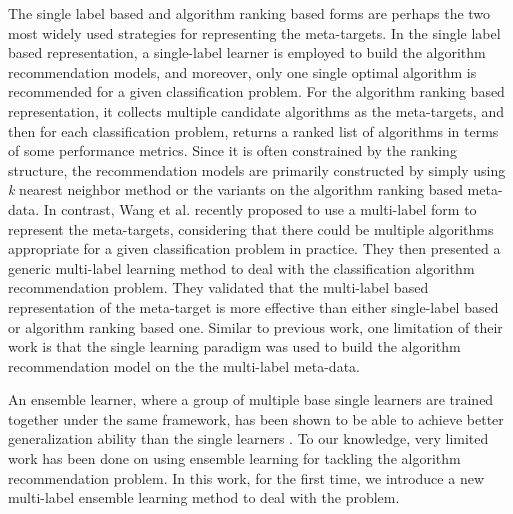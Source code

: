 \documentclass[acmsmall]{acmart}
\begin{document}




The single label based \cite{ali2006learning,kalousis2002algorithm,kalousis2004data}
and algorithm ranking based \cite{brazdil2003ranking,song2012automatic} forms are perhaps the two most widely used strategies for representing the meta-targets.
In the single label based representation,
a single-label learner is employed to build the algorithm recommendation models,
and moreover, only one single optimal algorithm is recommended for a given classification problem.
For the algorithm ranking based representation,
it collects multiple candidate algorithms as the meta-targets,
and then for each classification problem, returns a ranked list of algorithms in terms of some performance metrics.
Since it is often constrained by the ranking structure,
the recommendation models are primarily constructed by simply using \emph{k} nearest neighbor method or the variants on the algorithm ranking based meta-data.
In contrast,
Wang et al. \cite{wang2014generic} recently proposed to use a multi-label form to represent the meta-targets,
considering that there could be multiple algorithms appropriate for a given classification problem in practice.
They then presented a generic multi-label learning method to deal with the classification algorithm recommendation problem.
They validated that
the multi-label based representation of the meta-target is more effective than either single-label based or algorithm ranking based one.
Similar to previous work,
one limitation of their work is that
the single learning paradigm was used to build the algorithm recommendation model on the the multi-label meta-data.




An ensemble learner, where a group of multiple base single learners are trained together under the same framework, 
has been shown to be able to achieve better generalization ability than the single learners
\cite{dietterichl2002ensemble,dvzeroski2004combining}. 
To our knowledge, very limited work has been done on using ensemble learning for tackling the algorithm recommendation problem.
In this work, for the first time, we introduce a new multi-label ensemble learning method to deal with the problem. 
\end{document}
